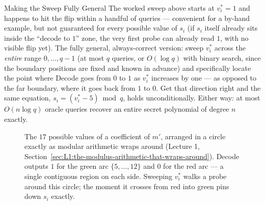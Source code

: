 \begin{rmkbox}{Making the Sweep Fully General}
The worked sweep above starts at $v_i^*=1$ and happens to hit the flip within a handful of queries --- convenient for a by-hand example, but not guaranteed for every possible value of $s_i$ (if $s_i$ itself already sits inside the ``decode to $1$'' zone, the very first probe can already read $1$, with no visible flip yet). The fully general, always-correct version: sweep $v_i^*$ across the \emph{entire} range $0,\ldots,q-1$ (at most $q$ queries, or $O(\log q)$ with binary search, since the boundary positions are fixed and known in advance) and specifically locate the point where Decode goes from $0$ to $1$ as $v_i^*$ increases by one --- as opposed to the far boundary, where it goes back from $1$ to $0$. Get that direction right and the same equation, $s_i = (v_i^* - 5)\bmod q$, holds unconditionally. Either way: at most $O(n\log q)$ oracle queries recover an entire secret polynomial of degree $n$ exactly.
\end{rmkbox}

\begin{figure}[ht]
\centering
{}
\caption{The $17$ possible values of a coefficient of $m'$, arranged in a circle exactly as modular arithmetic wraps around (Lecture 1, Section~\ref{sec:L1:the-modulus-arithmetic-that-wraps-around}). Decode outputs $1$ for the green arc $\{5,\ldots,12\}$ and $0$ for the red arc --- a single contiguous region on each side. Sweeping $v_i^*$ walks a probe around this circle; the moment it crosses from red into green pins down $s_i$ exactly.}
\label{fig:decode-boundary}
\end{figure}


